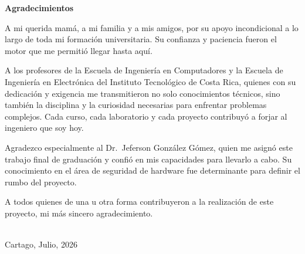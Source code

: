 
\thispagestyle{empty}
\cleardoublepage

\begin{center}
  \vspace*{1.5cm}
  {\Huge\bfseries Agradecimientos}
\end{center}

\vspace{1.5cm}

A mi querida mamá, a mi familia y a mis amigos, por su apoyo incondicional a lo
largo de toda mi formación universitaria. Su confianza y paciencia fueron el
motor que me permitió llegar hasta aquí.

A los profesores de la Escuela de Ingeniería en Computadores y la Escuela de
Ingeniería en Electrónica del Instituto Tecnológico de Costa Rica, quienes con
su dedicación y exigencia me transmitieron no solo conocimientos técnicos, sino
también la disciplina y la curiosidad necesarias para enfrentar problemas
complejos. Cada curso, cada laboratorio y cada proyecto contribuyó a forjar al
ingeniero que soy hoy.

Agradezco especialmente al Dr.\ Jeferson González Gómez, quien me asignó este
trabajo final de graduación y confió en mis capacidades para llevarlo a cabo. Su
conocimiento en el área de seguridad de hardware fue
determinante para definir el rumbo del proyecto. 

A todos quienes de una u otra forma contribuyeron a la realización de este
proyecto, mi más sincero agradecimiento.

\vspace*{\fill}

\begin{flushright}
\scriptAuthor\\[1mm]
Cartago, Julio, 2026
\end{flushright}

\cleardoublepage

